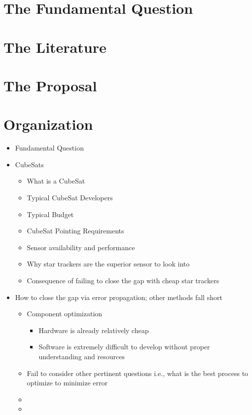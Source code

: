 \chapter{The Fundamental Question}


\chapter{The Literature}




\chapter{The Proposal}



\chapter{Organization}
\begin{itemize}
    \item Fundamental Question
    \item CubeSats
    \begin{itemize}
        \item What is a CubeSat
        \item Typical CubeSat Developers
        \item Typical Budget
        \item CubeSat Pointing Requirements 
        \item Sensor availability and performance 
        \item Why star trackers are the superior sensor to look into 
        \item Consequence of failing to close the gap with cheap star trackers 
    \end{itemize}
    \item How to close the gap via error propagation; other methods fall short
    \begin{itemize}
        \item Component optimization
        \begin{itemize}
            \item Hardware is already relatively cheap
            \item Software is extremely difficult to develop without proper understanding and resources
        \end{itemize}
        \item Fail to consider other pertinent questions i.e., what is the best process to optimize to minimize error 
        \item 
        \item 
    \end{itemize}
\end{itemize}
